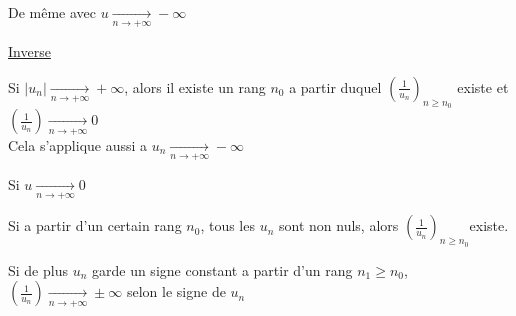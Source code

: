 \documentclass[12pt,twoside,a4paper]{article}
\begin{document}
\begin{prop}
\begin{liste}
\begin{liste}
				\end{liste}
				\item De m\^eme avec $u\mathop{\longrightarrow}\limits_{n\rightarrow+\infty}-\infty$
			\end{liste}
			\underline{Inverse}
			\begin{liste}
				\item Si $|u_n|\mathop{\longrightarrow}\limits_{n\rightarrow+\infty}+\infty$, alors il existe un rang $n_0$ a partir duquel $\left(\frac{1}{u_n}\right)_{n\geqslant n_0}$ existe et $\left(\frac{1}{u_n}\right)\mathop{\longrightarrow}\limits_{n\rightarrow+\infty}0$\\
					Cela s'applique aussi a $u_n\mathop{\longrightarrow}\limits_{n\rightarrow+\infty}-\infty$
				\item Si $u\mathop{\longrightarrow}\limits_{n\rightarrow+\infty}0$
				\begin{liste}
					\item Si a partir d'un certain rang $n_0$, tous les $u_n$ sont non nuls, alors $\left(\frac{1}{u_n}\right)_{n\geqslant n_0}$existe.
					\item Si de plus $u_n$ garde un signe constant a partir d'un rang $n_1\geqslant n_0$, $\left(\frac{1}{u_n}\right)\mathop{\longrightarrow}\limits_{n\rightarrow+\infty}\pm\infty$ selon le signe de $u_n$
				\end{liste}
			\end{liste}
		\end{prop}
\end{document}
